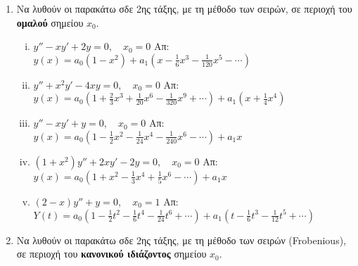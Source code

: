 



\pagestyle{askhseis}





\begin{center}
  \minibox{\large\bfseries  \textcolor{Col1}{Ασκήσεις στη μέθοδο Σειρών - Frobenious}}
\end{center}

\vspace{\baselineskip}

\begin{enumerate}
  \item  Να λυθούν οι παρακάτω σδε 2ης τάξης, με τη μέθοδο των σειρών, σε περιοχή του
    \textbf{ομαλού} σημείου $ x_{0} $. 

    \begin{enumerate}[i)]
      \item $ y'' - xy' + 2y = 0, \quad  x_{0} = 0 $ 
        \hfill Απ: $ \scriptstyle{ y(x) = a_{0} \left(1 - x^{2}\right)} + a_{1} 
        \left(x - \frac{1}{6}x^{3} - \frac{1}{120}x^{5} - \cdots \right) $ 

      \item $ y'' + x^{2}y' - 4xy = 0, \quad x_{0} = 0 $ 
        \hfill Απ: $ \scriptstyle {y(x) = a_{0}\left(1 + \frac{2}{3} x^{3} + 
          \frac{1}{20} x^{6} - \frac{1}{320} x^{9} + \cdots\right) + 
        a_{1}\left(x + \frac{1}{4} x^{4}\right)} $  

      \item $ y'' - xy' + y = 0, \quad x_{0} = 0 $ 
        \hfill Απ: $ \scriptstyle{ y(x) = a_{0}\left(1 - \frac{1}{2} x^{2} - 
        \frac{1}{24} x^{4} - \frac{1}{240} x^{6} - \cdots\right)} + a_{1} x $ 

      \item $ (1+x^{2})y'' + 2xy' - 2y = 0, \quad x_{0} = 0  $ 
        \hfill Απ: $ \scriptstyle{ y(x) = a_{0}\left(1 + x^{2} - \frac{1}{3} x^{4} + 
        \frac{1}{5} x^{6} - \cdots\right) + a_{1} x }$  

      \item \label{eq:5} $ (2-x)y'' + y = 0, \quad x_{0} = 1$ 
        \hfill Απ: $ \scriptstyle{ Y(t) = a_{0}\left(1 - \frac{1}{2} t^{2} - 
          \frac{1}{6} t^{4} - \frac{1}{24} t^{6} + \cdots\right) + 
        a_{1}\left(t - \frac{1}{6}t^{3} - \frac{1}{12}t^{5} + \cdots \right)}$ 
    \end{enumerate}

  \item Να λυθούν οι παρακάτω σδε 2ης τάξης, με τη μέθοδο των σειρών (Frobenious),
    σε περιοχή του \textbf{κανονικού ιδιάζοντος} σημείου $ x_{0} $.


\end{enumerate}
